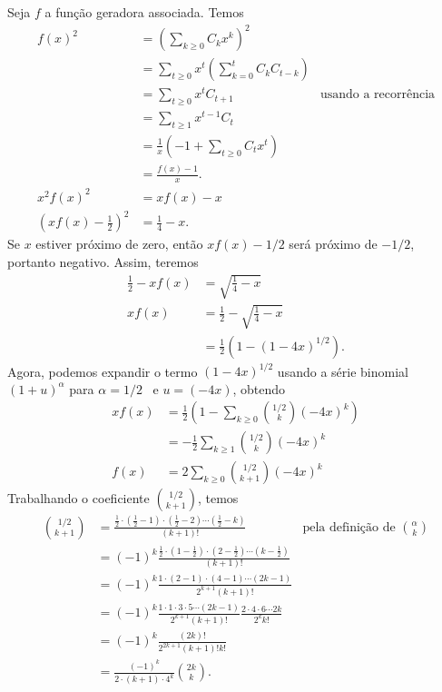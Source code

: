 Seja $f$ a função geradora associada.
Temos
\begin{align*}
    f(x)^2 &= \left(\sum_{k \geq 0} C_k x^k\right)^2 \\
           &= \sum_{t \geq 0} x^t \left( \sum_{k = 0}^t C_k C_{t-k} \right) \\
           &= \sum_{t \geq 0} x^t C_{t+1}
            & \text{usando a recorrência}\\
           &= \sum_{t \geq 1} x^{t-1} C_t \\
           &= \frac 1 x \left( -1 + \sum_{t \geq 0} C_t x^t \right) \\
           &= \frac{f(x) - 1}{x}. \\
    x^2 f(x)^2 &= xf(x) - x \\
    \left(xf(x) - \frac 1 2\right)^2 &= \frac 1 4 - x.
\end{align*}
Se $x$ estiver próximo de zero,
então $xf(x) - 1/2$ será próximo de $-1/2$,
portanto negativo.
Assim, teremos
\begin{align*}
    \frac 1 2 - xf(x) &= \sqrt{\frac 1 4 - x} \\
    xf(x) &= \frac 1 2 - \sqrt{\frac 1 4 - x} \\
          &= \frac 1 2 (1 - (1 - 4x)^{1/2}).
\end{align*}
Agora, podemos expandir o termo $(1 - 4x)^{1/2}$
usando a série binomial $(1 + u)^\alpha$ para $\alpha = 1/2$~\cite[p.~487]{Spivak1994}
e $u = (-4x)$,
obtendo
\begin{align*}
    xf(x) &= \frac 1 2 \left( 1 - \sum_{k \geq 0} \binom{1/2}{k} (-4x)^k \right) \\
          &= -\frac 1 2 \sum_{k \geq 1} \binom{1/2}{k} (-4x)^k \\
    f(x) &= 2 \sum_{k \geq 0} \binom{1/2}{k+1} (-4x)^k
\end{align*}
Trabalhando o coeficiente $\binom{1/2}{k+1}$, temos
\begin{align*}
    \binom{1/2}{k+1} &= \frac{
        \frac 1 2 \cdot (\frac 1 2 - 1) \cdot (\frac 1 2 - 2) \cdots (\frac 1 2 - k)
    }{ (k+1)! } & \text{pela definição de $\textstyle \binom \alpha k$}\\
    &= (-1)^k \frac{
        \frac 1 2 \cdot (1 - \frac 1 2) \cdot (2 - \frac 1 2) \cdots (k - \frac 1 2)
    }{ (k+1)! } \\
    &= (-1)^k \frac{
        1 \cdot (2 - 1) \cdot (4 - 1) \cdots (2k - 1)
    }{ 2^{k + 1} (k + 1)! } \\
    &= (-1)^k \frac{ 1 \cdot 1 \cdot 3 \cdot 5 \cdots (2k - 1) }{2^{k+1} (k+1)!}
        \frac{2 \cdot 4 \cdot 6 \cdots 2k}{2^k k!} \\
    &= (-1)^k \frac{ (2k)! }{2^{2k+1} (k+1)! k!} \\
    &= \frac{(-1)^k}{2 \cdot (k+1) \cdot 4^k} \binom{2k}{k}.
\end{align*}
